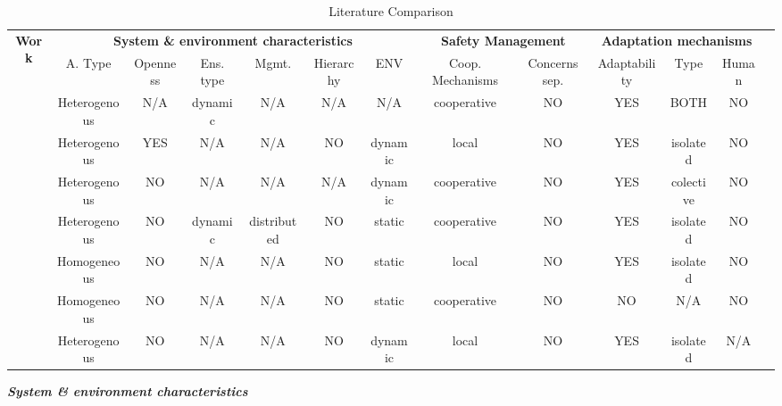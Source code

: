 \documentclass[journal]{IEEEtran}
\theoremstyle{definition}
\begin{document}
\renewcommand{\arraystretch}{1.0}
\begin{table}[bth]
\footnotesize
\begin{tabular}{|c|c|c|c|c|c|c|c|c|c|c|c|c|}
\hline
\multirow{2}{*}{{\bf Work}}&
\multicolumn{6}{|c|}{\textbf{System \& environment characteristics}} 
&\multicolumn{2}{|c|}{\textbf{Safety Management}}
&\multicolumn{3}{|c|}{\textbf{Adaptation mechanisms}}\\
\cline{2-12}
& A. Type & Openness & Ens. type & Mgmt. & Hierarchy &  ENV & Coop. Mechanisms & Concerns sep. & Adaptability &Type  & Human \\
\hline

\cite{cui2014refresh} & Heterogenous & N/A & dynamic & N/A & N/A & N/A & cooperative & NO & YES & BOTH & NO\\
\cite{parker1998alliance} & Heterogenous & YES & N/A & N/A & NO &  dynamic & local & NO & YES & isolated & NO \\
\cite{morais2015distributed}& Heterogenous & NO & N/A & N/A &  N/A & dynamic & cooperative & NO & YES & colective & NO  \\

\cite{khan2015framework} & Heterogenous & NO & dynamic & distributed & NO & static & cooperative & NO  & YES & isolated & NO\\
\cite{castello2016adaptive} & Homogeneous & NO & N/A & N/A & NO  & static & local & NO & YES & isolated & NO\\
\cite{desai2017drona} & Homogeneous & NO & N/A & N/A & NO & static & cooperative & NO & NO & N/A & NO \\
\cite{decastro2018collision} &  Heterogenous & NO & N/A & N/A &  NO & dynamic & local & NO & YES & isolated & N/A \\

 


\hline
\end{tabular}
\caption{Literature Comparison}
\label{tab:literature}
\end{table}



\textbf{\textit{System \& environment characteristics}}
\end{document}
